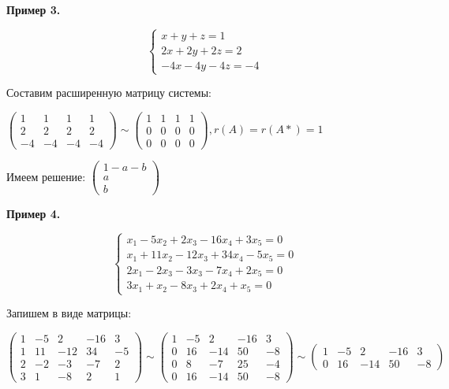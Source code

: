 \documentclass{article}
\begin{document}
\begin{flushleft}
\hfill

\textbf{Пример 3.}

\begin{equation}
    \begin{cases}
        x + y + z = 1 \\
        2x + 2y + 2z = 2 \\
        -4x - 4y - 4z = -4
    \end{cases}
\end{equation}

Составим расширенную матрицу системы:

$\begin{pmatrix}
    1 & 1 & 1 & 1 \\
    2 & 2 & 2 & 2 \\
    -4 & -4 & -4 & -4
\end{pmatrix} \sim \begin{pmatrix}
    1 & 1 & 1 & 1 \\
    0 & 0 & 0 & 0 \\
    0 & 0 & 0 & 0
\end{pmatrix}, r(A) = r(A*) = 1$

\hfill

Имеем решение: $\begin{pmatrix}
    1 - a - b \\
    a \\
    b
\end{pmatrix}$

\textbf{Пример 4.}

\begin{equation}
    \begin{cases}
        x_1 - 5x_2 + 2x_3 - 16x_4 + 3x_5 = 0 \\
        x_1 + 11x_2 - 12x_3 + 34x_4 - 5x_5 = 0 \\
        2x_1 - 2x_3 - 3x_3 - 7x_4 + 2x_5 = 0 \\
        3x_1 + x_2 - 8x_3 + 2x_4 + x_5 = 0
    \end{cases}
\end{equation}

Запишем в виде матрицы:

$\begin{pmatrix}
    1 & -5 & 2 & -16 & 3 \\
    1 & 11 & -12 & 34 & -5 \\
    2 & -2 & -3 & -7 & 2 \\
    3 & 1 & -8 & 2 & 1
\end{pmatrix} \sim \begin{pmatrix}
    1 & -5 & 2 & -16 & 3 \\
    0 & 16 & -14 & 50 & -8 \\
    0 & 8 & -7 & 25 & -4 \\
    0 & 16 & -14 & 50 & -8
\end{pmatrix} \sim \begin{pmatrix}
    1 & -5 & 2 & -16 & 3 \\
    0 & 16 & -14 & 50 & -8
\end{pmatrix}$ 


\end{flushleft}
\end{document}
